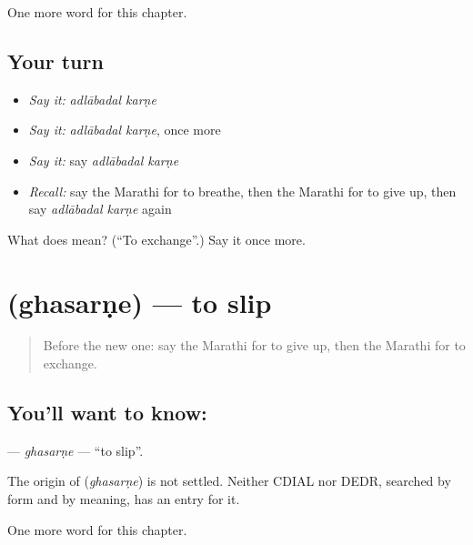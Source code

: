 \begin{grammarlens}[title={What you've built}]
One more word for this chapter.
\end{grammarlens}

\subsection*{Your turn}
\begin{itemize}
\raggedright
  \item \emph{Say it:} \emph{adlābadal karṇe}
  \item \emph{Say it:} \emph{adlābadal karṇe}, once more
  \item \emph{Say it:} say \emph{adlābadal karṇe}
  \item \emph{Recall:} say the Marathi for to breathe, then the Marathi for to give up, then say \emph{adlābadal karṇe} again
\end{itemize}

\begin{tcolorbox}[breakable,colback=teal!4,colframe=teal!35!black,title={Before you move on}]
What does   mean? (\textquotedblleft{}To exchange\textquotedblright{}.) Say it once more.
\end{tcolorbox}
\section[\texorpdfstring{\mr{घसरणे} (ghasarṇe)}{घसरणे (ghasarṇe)}]{ (ghasarṇe) — to slip}

\label{lesson:MR-C167-ghasarne}



\begin{quote}
Before the new one: say the Marathi for to give up, then the Marathi for to exchange.
\end{quote}

\subsection*{You'll want to know: }
\textbf{} — \emph{ghasarṇe} — \textquotedblleft{}to slip\textquotedblright{}.

\begin{cousinweb}
The origin of \textbf{} (\emph{ghasarṇe}) is not settled. Neither CDIAL nor DEDR, searched by form and by meaning, has an entry for it.
\end{cousinweb}

\begin{grammarlens}[title={What you've built}]
One more word for this chapter.
\end{grammarlens}

